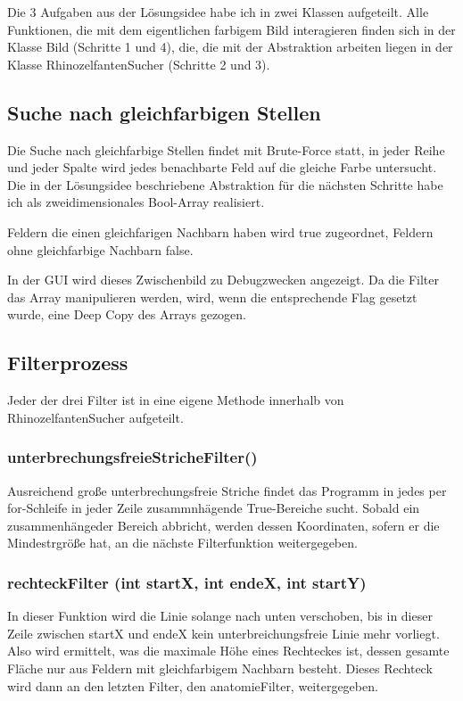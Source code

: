 Die 3 Aufgaben aus der Lösungsidee habe ich in zwei Klassen aufgeteilt. Alle Funktionen, die mit dem eigentlichen farbigem Bild interagieren finden sich in der Klasse Bild (Schritte 1 und 4), die, die mit der Abstraktion arbeiten liegen in der Klasse RhinozelfantenSucher (Schritte 2 und 3).

	\subsection {Suche nach gleichfarbigen Stellen}

	Die Suche nach gleichfarbige Stellen findet mit Brute-Force statt, in jeder Reihe und jeder Spalte wird jedes benachbarte Feld auf die gleiche Farbe untersucht. Die in der Lösungsidee beschriebene Abstraktion für die nächsten Schritte habe ich als zweidimensionales Bool-Array realisiert. 

	Feldern die einen gleichfarigen Nachbarn haben wird true zugeordnet, Feldern ohne gleichfarbige Nachbarn false.

	In der GUI wird dieses Zwischenbild zu Debugzwecken angezeigt. Da die Filter das Array manipulieren werden, wird, wenn die entsprechende Flag gesetzt wurde, eine Deep Copy des Arrays gezogen.

		 

	\subsection {Filterprozess}

	Jeder der drei Filter ist in eine eigene Methode innerhalb von RhinozelfantenSucher aufgeteilt.

		\subsubsection{unterbrechungsfreieStricheFilter()}

		Ausreichend große unterbrechungsfreie Striche findet das Programm in jedes per for-Schleife in jeder Zeile zusammnhägende True-Bereiche sucht. Sobald ein zusammenhängeder Bereich abbricht, werden dessen Koordinaten, sofern er die Mindestrgröße hat, an die nächste Filterfunktion weitergegeben.
		

		\subsubsection{rechteckFilter (int startX, int endeX, int startY)}
		In dieser Funktion wird die Linie solange nach unten verschoben, bis in dieser Zeile zwischen startX und endeX kein unterbreichungsfreie Linie mehr vorliegt. Also wird ermittelt, was die maximale Höhe eines Rechteckes ist, dessen gesamte Fläche nur aus Feldern mit gleichfarbigem Nachbarn besteht. Dieses Rechteck wird dann an den letzten Filter, den anatomieFilter, weitergegeben.

